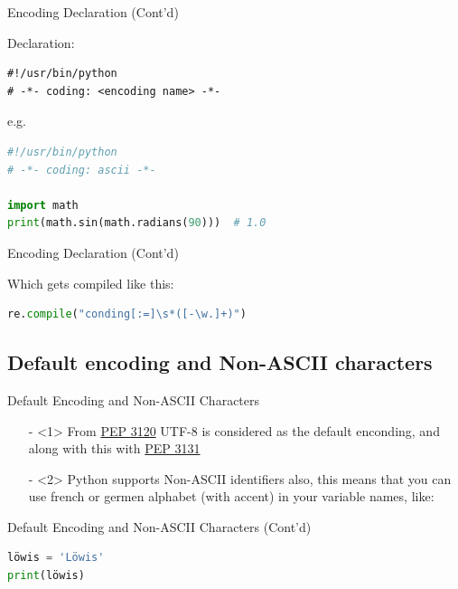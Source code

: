 \documentclass[aspectratio=169, dvipsnames, svgnames, x11names]{beamer}
\begin{document}
\begin{frame}[fragile]{Encoding Declaration (Cont'd)}

\begin{flushleft}
Declaration:
\begin{lstlisting}
#!/usr/bin/python
# -*- coding: <encoding name> -*-
\end{lstlisting}
\end{flushleft}

\begin{flushleft}
e.g.
\begin{lstlisting}[language=python, keywordstyle=\color{Mulberry}\textbf]
#!/usr/bin/python
# -*- coding: ascii -*-

import math
print(math.sin(math.radians(90)))  # 1.0
\end{lstlisting}
\end{flushleft}
\end{frame}

\begin{frame}[fragile]{Encoding Declaration (Cont'd)}
\begin{flushleft}
Which gets compiled like this:
\begin{lstlisting}[language=python]
re.compile("conding[:=]\s*([-\w.]+)")
\end{lstlisting}
\end{flushleft}
\end{frame}

\subsection{Default encoding and Non-ASCII characters}
\begin{frame}{Default Encoding and Non-ASCII Characters}
\begin{itemize}
\item[-]<1>
From \href{https://peps.python.org/pep-3120/}{PEP 3120} UTF-8 is considered as the default enconding, and along with this with \href{https://peps.python.org/pep-3131/}{PEP 3131}

\item[-]<2>
Python supports Non-ASCII identifiers also, this means that you can use french or germen alphabet
(with accent) in your variable names, like:
\end{itemize}
\end{frame}

\begin{frame}[fragile]{Default Encoding and Non-ASCII Characters (Cont'd)}
\begin{lstlisting}[language=python, keywordstyle=\color{Mulberry}\textbf]
löwis = 'Löwis'
print(löwis)
\end{lstlisting}
\end{frame}
\end{document}
